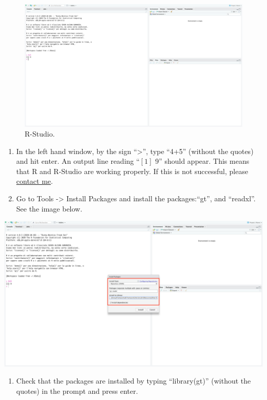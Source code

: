 \documentclass[
]{article}
\providecommand{\tightlist}{%
  \setlength{\itemsep}{0pt}\setlength{\parskip}{0pt}}
\begin{document}
\begin{figure}[H]

{\centering \includegraphics[width=0.8\linewidth,]{images/rstudio2} 

}

\caption{R-Studio.}\label{fig:unnamed-chunk-4}
\end{figure}

\begin{enumerate}
\def\labelenumi{\arabic{enumi}.}
\setcounter{enumi}{5}
\item
  In the left hand window, by the sign ``\textgreater{}'', type ``4+5'' (without the quotes) and hit enter. An output line reading ``\([1]\) 9'' should appear. This means that R and R-Studio are working properly. If this is not successful, please \href{\%5Bmailto:\%20info@federicoroscioli.com\%5D(mailto:\%20info@federicoroscioli.com)\%7B.uri\%7D}{contact me}.
\item
  Go to Tools -\textgreater{} Install Packages and install the packages:``gt'', and ``readxl''. See the image below.\\
\end{enumerate}

\begin{center}\includegraphics[width=0.8\linewidth,]{images/pkg1} \end{center}

\begin{enumerate}
\def\labelenumi{\arabic{enumi}.}
\setcounter{enumi}{7}
\tightlist
\item
  Check that the packages are installed by typing ``library(gt)'' (without the quotes) in the prompt and press enter.\\
\end{enumerate}
\end{document}
